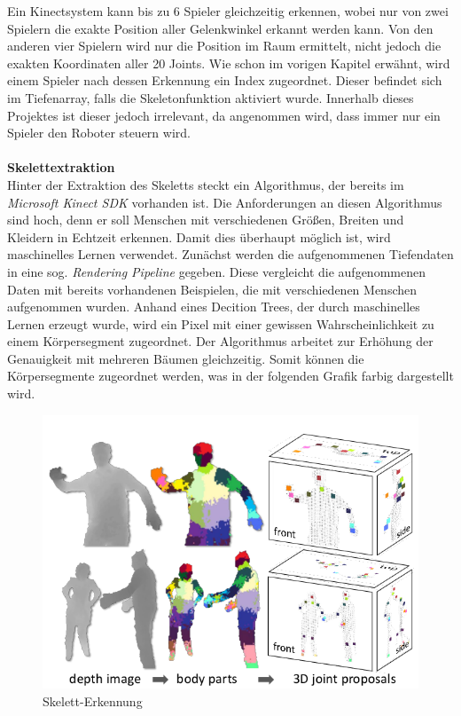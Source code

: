 Ein Kinectsystem kann bis zu 6 Spieler gleichzeitig erkennen, wobei nur von zwei Spielern die exakte Position aller Gelenkwinkel erkannt werden kann. Von den anderen vier Spielern wird nur die Position im Raum ermittelt, nicht jedoch die exakten Koordinaten aller 20 Joints. Wie schon im vorigen Kapitel erwähnt, wird einem Spieler nach dessen Erkennung ein Index zugeordnet. Dieser befindet sich im Tiefenarray, falls die Skeletonfunktion aktiviert wurde. Innerhalb dieses Projektes ist dieser jedoch irrelevant, da angenommen wird, dass immer nur ein Spieler
den Roboter steuern wird.\\ \\
\textbf{Skelettextraktion}\\
Hinter der Extraktion des Skeletts steckt ein Algorithmus, der bereits im \textit{Microsoft Kinect SDK} vorhanden ist. 
Die Anforderungen an diesen Algorithmus sind hoch, denn er soll Menschen mit verschiedenen Größen,
Breiten und Kleidern in Echtzeit erkennen.
Damit dies überhaupt möglich ist, wird maschinelles Lernen verwendet. Zunächst werden die aufgenommenen Tiefendaten in eine sog. \textit{Rendering Pipeline}\cite{pdf:realtime_human_pose} gegeben. Diese vergleicht die aufgenommenen Daten mit bereits
vorhandenen Beispielen, die mit verschiedenen Menschen aufgenommen wurden. Anhand eines Decition Trees, der durch maschinelles Lernen erzeugt wurde, wird ein Pixel mit einer gewissen Wahrscheinlichkeit zu einem Körpersegment zugeordnet. Der Algorithmus arbeitet zur Erhöhung der Genauigkeit mit mehreren Bäumen gleichzeitig. Somit können die Körpersegmente zugeordnet werden, was in der folgenden Grafik farbig dargestellt wird.

\begin{figure}[H]						
	\centering							
	\includegraphics[scale=0.5]{Bilder/kinect_body_parts.png}			
	\caption{Skelett-Erkennung \cite{pdf:realtime_human_pose}}						
	\label{f:kinect_skeleton}						
\end{figure}


